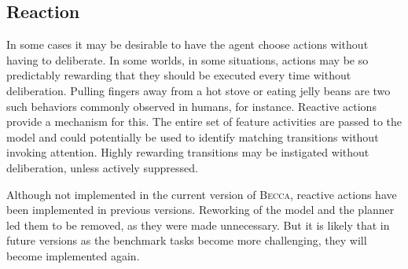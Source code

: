 \subsection{Reaction}
In some cases it may be desirable to have the agent choose actions without having to deliberate. In some worlds, in some situations, actions may be so predictably rewarding that they should be executed every time without deliberation. Pulling fingers away from a hot stove or eating jelly beans are two such behaviors commonly observed in humans, for instance. Reactive actions provide a mechanism for this. The entire set of feature activities are passed to the model and could potentially be used to identify matching transitions without invoking attention. Highly rewarding transitions may be instigated without deliberation, unless actively suppressed. 

Although not implemented in the current version of \textsc{Becca}, reactive actions have been implemented in previous versions. Reworking of the model and the planner led them to be removed, as they were made unnecessary. But it is likely that in future versions as the benchmark tasks become more challenging, they will become implemented again.
